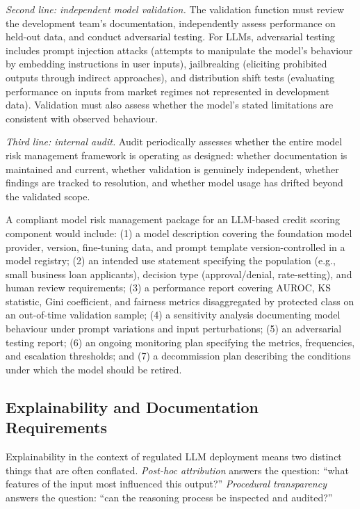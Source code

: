 \begin{context}
\emph{Second line: independent model validation.} The validation function must review the development team's documentation, independently assess performance on held-out data, and conduct adversarial testing. For LLMs, adversarial testing includes prompt injection attacks (attempts to manipulate the model's behaviour by embedding instructions in user inputs), jailbreaking (eliciting prohibited outputs through indirect approaches), and distribution shift tests (evaluating performance on inputs from market regimes not represented in development data). Validation must also assess whether the model's stated limitations are consistent with observed behaviour.

\emph{Third line: internal audit.} Audit periodically assesses whether the entire model risk management framework is operating as designed: whether documentation is maintained and current, whether validation is genuinely independent, whether findings are tracked to resolution, and whether model usage has drifted beyond the validated scope.

\begin{example}
\label{ex:sr117-checklist}
A compliant model risk management package for an LLM-based credit scoring component would include: (1) a model description covering the foundation model provider, version, fine-tuning data, and prompt template version-controlled in a model registry; (2) an intended use statement specifying the population (e.g., small business loan applicants), decision type (approval/denial, rate-setting), and human review requirements; (3) a performance report covering AUROC, KS statistic, Gini coefficient, and fairness metrics disaggregated by protected class on an out-of-time validation sample; (4) a sensitivity analysis documenting model behaviour under prompt variations and input perturbations; (5) an adversarial testing report; (6) an ongoing monitoring plan specifying the metrics, frequencies, and escalation thresholds; and (7) a decommission plan describing the conditions under which the model should be retired.
\end{example}

\subsection{Explainability and Documentation Requirements}
\label{subsec:af-deployment-explainability}

Explainability in the context of regulated LLM deployment means two distinct things that are often conflated. \emph{Post-hoc attribution} answers the question: ``what features of the input most influenced this output?'' \emph{Procedural transparency} answers the question: ``can the reasoning process be inspected and audited?''


\end{context}
